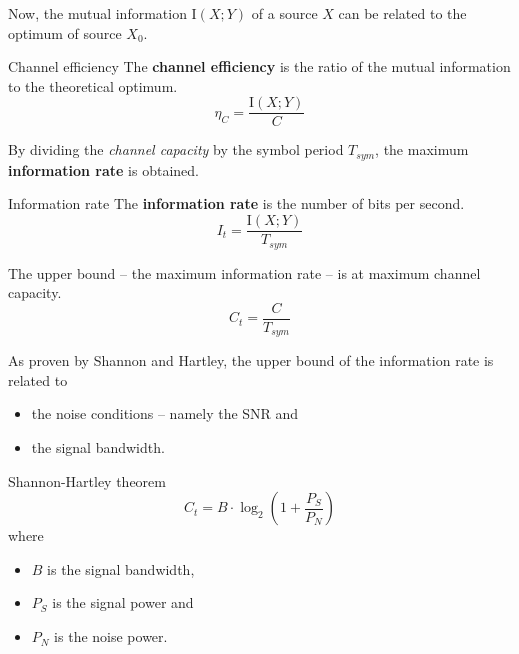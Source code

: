 \begin{refsection}
Now, the mutual information $\mathrm{I}\left(X; Y\right)$ of a source $X$ can be related to the optimum of source $X_0$.

\begin{definition}{Channel efficiency}
	The  \textbf{channel efficiency} is the ratio of the mutual information to the theoretical optimum.
	\begin{equation}
		\eta_C = \frac{\mathrm{I}\left(X; Y\right)}{C}
	\end{equation}
\end{definition}


By dividing the \emph{channel capacity} by the symbol period $T_{sym}$, the maximum  \textbf{information rate} is obtained.

\begin{definition}{Information rate}
	The  \textbf{information rate} is the number of bits per second.
	\begin{equation}
		I_t = \frac{\mathrm{I}\left(X; Y\right)}{T_{sym}}
	\end{equation}

	The upper bound -- the maximum information rate -- is at maximum channel capacity.
	\begin{equation}
		C_t = \frac{C}{T_{sym}}
	\end{equation}
\end{definition}

As proven by Shannon and Hartley, the upper bound of the information rate is related to
\begin{itemize}
	\item the noise conditions -- namely the \ac{SNR} and
	\item the signal bandwidth.
\end{itemize}

\begin{definition}{Shannon-Hartley theorem}
	\begin{equation}
		C_t = B \cdot \log_2 \left(1 + \frac{P_S}{P_N}\right)
	\end{equation}
	where
	\begin{itemize}
		\item $B$ is the signal bandwidth,
		\item $P_S$ is the signal power and
		\item $P_N$ is the noise power.
	\end{itemize}
\end{definition}


\end{refsection}
